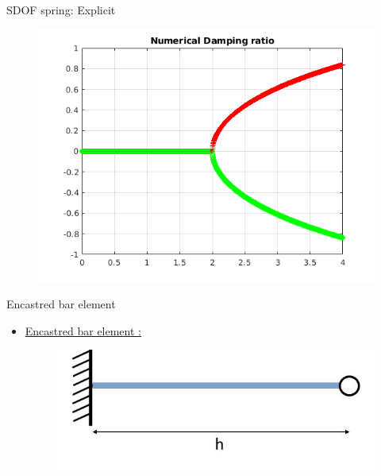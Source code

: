 \begin{frame}{SDOF spring: Explicit}
\begin{figure}[ht]
\begin{minipage}[b]{0.5\linewidth}
  \end{minipage}%
  \begin{minipage}[b]{0.5\linewidth}
    \centering
    \includegraphics[scale=.35]{images/sdof-exp-4.png} \\

  \end{minipage} 
\end{figure}
\end{frame}

\begin{frame}{Encastred bar element}
\begin{itemize}
\item \underline{Encastred bar element :}
\begin{figure}
\centering
\includegraphics[width=0.5\linewidth]{images/encastred.jpg}
\end{figure}
\end{itemize}
\end{frame}

